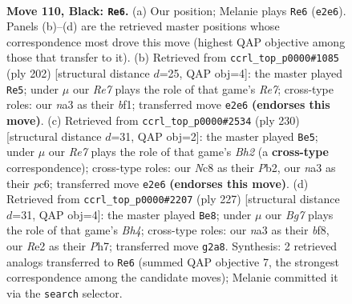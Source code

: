 \documentclass[11pt]{article}
\begin{document}
\clearpage

\begin{figure}[p]\centering
\begin{subfigure}{0.46\textwidth}\centering
\resizebox{\linewidth}{!}{%
\newchessgame
\chessboard[
  setfen={2n3K1/8/p7/P1k2p1p/5B2/N5P1/4r1b1/R7 b - - 31 110},
  showmover=false,
  pgfstyle=straightmove, color=movearrow, markmove={e2-e6}
]}
\caption{}
\end{subfigure}\hfill
\begin{subfigure}{0.46\textwidth}\centering
\resizebox{\linewidth}{!}{%
\newchessgame
\chessboard[
  setfen={7k/1B2R3/p5p1/P1K3P1/8/8/8/3r1b2 w - - 58 102},
  showmover=false,
  pgfstyle=straightmove, color=movearrow, markmove={e7-e5}
]}
\caption{}
\end{subfigure}
\\[4pt]
\begin{subfigure}{0.46\textwidth}\centering
\resizebox{\linewidth}{!}{%
\newchessgame
\chessboard[
  setfen={2k5/8/p1p1n1p1/8/P1K1P2P/8/1P5B/8 w - - 31 116},
  showmover=false,
  pgfstyle=straightmove, color=movearrow, markmove={h2-e5}
]}
\caption{}
\end{subfigure}\hfill
\begin{subfigure}{0.46\textwidth}\centering
\resizebox{\linewidth}{!}{%
\newchessgame
\chessboard[
  setfen={5B2/7p/4p3/4PpPb/p7/P1k1K1P1/8/8 b - - 4 114},
  showmover=false,
  pgfstyle=straightmove, color=movearrow, markmove={h5-e8}
]}
\caption{}
\end{subfigure}
\caption{\textbf{Move 110, Black: \texttt{Re6}.} (a) Our position; Melanie plays \texttt{Re6} (\texttt{e2e6}). Panels (b)--(d) are the retrieved master positions whose correspondence most drove this move (highest QAP objective among those that transfer to it). (b) Retrieved from \texttt{ccrl\_top\_p0000\#1085} (ply 202) [structural distance $d$=25, QAP obj=4]: the master played \texttt{Re5}; under $\mu$ our \emph{Re7} plays the role of that game's \emph{Re7}; cross-type roles: our \emph{n}a3 as their \emph{b}f1; transferred move \texttt{e2e6} \textbf{(endorses this move)}. (c) Retrieved from \texttt{ccrl\_top\_p0000\#2534} (ply 230) [structural distance $d$=31, QAP obj=2]: the master played \texttt{Be5}; under $\mu$ our \emph{Re7} plays the role of that game's \emph{Bh2} (a \textbf{cross-type} correspondence); cross-type roles: our \emph{N}c8 as their \emph{P}b2, our \emph{n}a3 as their \emph{p}c6; transferred move \texttt{e2e6} \textbf{(endorses this move)}. (d) Retrieved from \texttt{ccrl\_top\_p0000\#2207} (ply 227) [structural distance $d$=31, QAP obj=4]: the master played \texttt{Be8}; under $\mu$ our \emph{Bg7} plays the role of that game's \emph{Bh4}; cross-type roles: our \emph{n}a3 as their \emph{b}f8, our \emph{R}e2 as their \emph{P}h7; transferred move \texttt{g2a8}. Synthesis: 2 retrieved analogs transferred to \texttt{Re6} (summed QAP objective 7, the strongest correspondence among the candidate moves); Melanie committed it via the \texttt{search} selector.}
\label{fig:thought-m219}
\end{figure}
\end{document}

